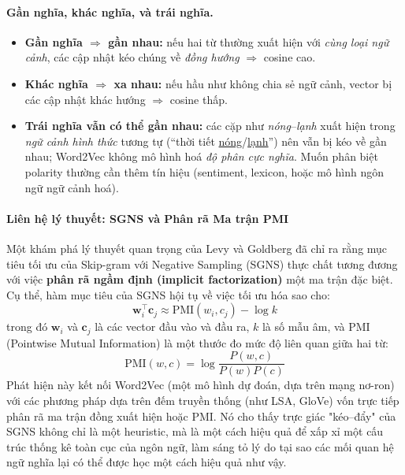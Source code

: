 \paragraph{Gần nghĩa, khác nghĩa, và trái nghĩa.}
\begin{itemize}
    \item \textbf{Gần nghĩa $\Rightarrow$ gần nhau:} nếu hai từ thường xuất hiện với \emph{cùng loại ngữ cảnh}, các cập nhật kéo chúng về \emph{đồng hướng} $\Rightarrow$ cosine cao.
    \item \textbf{Khác nghĩa $\Rightarrow$ xa nhau:} nếu hầu như không chia sẻ ngữ cảnh, vector bị các cập nhật khác hướng $\Rightarrow$ cosine thấp.
    \item \textbf{Trái nghĩa vẫn có thể gần nhau:} các cặp như \textit{nóng}--\textit{lạnh} xuất hiện trong \emph{ngữ cảnh hình thức} tương tự (``thời tiết \underline{nóng}/\underline{lạnh}'') nên vẫn bị kéo về gần nhau; Word2Vec không mô hình hoá \emph{độ phân cực nghĩa}. Muốn phân biệt polarity thường cần thêm tín hiệu (sentiment, lexicon, hoặc mô hình ngôn ngữ ngữ cảnh hoá).
\end{itemize}

\paragraph{Liên hệ lý thuyết: SGNS và Phân rã Ma trận PMI}
Một khám phá lý thuyết quan trọng của Levy và Goldberg \cite{levy2014neural} đã chỉ ra rằng mục tiêu tối ưu của Skip-gram với Negative Sampling (SGNS) thực chất tương đương với việc \textbf{phân rã ngầm định (implicit factorization)} một ma trận đặc biệt.  Cụ thể, hàm mục tiêu của SGNS hội tụ về việc tối ưu hóa sao cho:
\[ \mathbf{w}_i^\top \mathbf{c}_j \approx \text{PMI}(w_i, c_j) - \log k \]
trong đó $\mathbf{w}_i$ và $\mathbf{c}_j$ là các vector đầu vào và đầu ra, $k$ là số mẫu âm, và PMI (Pointwise Mutual Information) là một thước đo mức độ liên quan giữa hai từ:
\[ \text{PMI}(w, c) = \log \frac{P(w, c)}{P(w)P(c)} \]
Phát hiện này kết nối Word2Vec (một mô hình dự đoán, dựa trên mạng nơ-ron) với các phương pháp dựa trên đếm truyền thống (như LSA, GloVe) vốn trực tiếp phân rã ma trận đồng xuất hiện hoặc PMI. Nó cho thấy trực giác "kéo--đẩy" của SGNS không chỉ là một heuristic, mà là một cách hiệu quả để xấp xỉ một cấu trúc thống kê toàn cục của ngôn ngữ, làm sáng tỏ lý do tại sao các mối quan hệ ngữ nghĩa lại có thể được học một cách hiệu quả như vậy.

